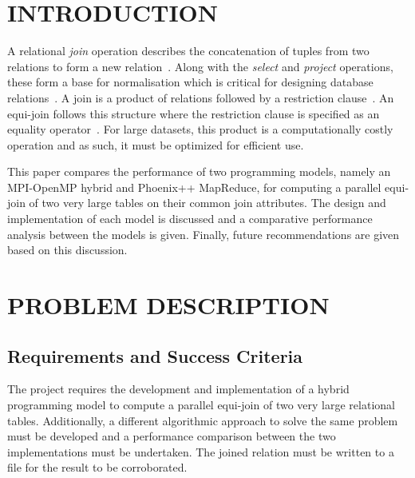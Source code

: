 \documentclass[12pt,twocolumn]{witseiepaper}
\begin{document}

\maketitle
\thispagestyle{empty}
\pagestyle{plain}
\setcounter{page}{1}

\section{INTRODUCTION}

A relational \textit{join} operation describes the concatenation of tuples from two relations to form a new relation~\cite{stanczyk2001theory}. Along with the \textit{select} and \textit{project} operations, these form a base for normalisation which is critical for designing database relations~\cite{stanczyk2001theory}. A join is a product of relations followed by a restriction clause~\cite{stanczyk2001theory}. An equi-join follows this structure where the restriction clause is specified as an equality operator~\cite{stanczyk2001theory}. For large datasets, this product is a computationally costly operation and as such, it must be optimized for efficient use.

This paper compares the performance of two programming models, namely an MPI-OpenMP hybrid and Phoenix++ MapReduce, for computing a parallel equi-join of two very large tables on their common join attributes. The design and implementation of each model is discussed and a comparative performance analysis between the models is given. Finally, future recommendations are given based on this discussion.

\section{PROBLEM DESCRIPTION}

\subsection{Requirements and Success Criteria}

The project requires the development and implementation of a hybrid programming model to compute a parallel equi-join of two very large relational tables. Additionally, a different algorithmic approach to solve the same problem must be developed and a performance comparison between the two implementations must be undertaken. The joined relation must be written to a file for the result to be corroborated.
\end{document}
